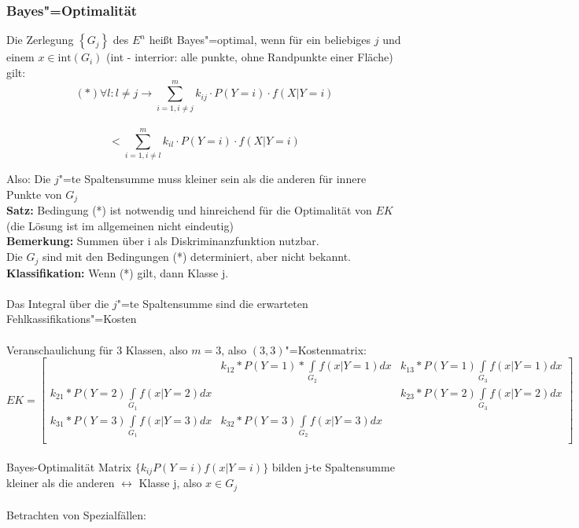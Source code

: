 \documentclass[a4paper,12pt]{scrreprt}
\newcommand{\Nb}[1]{\textbf{#1}}
\begin{document}
\subsubsection{Bayes"=Optimalität}
Die Zerlegung $\left\{ G_j \right\}$ des $E^n$ heißt Bayes"=optimal,
wenn für ein beliebiges $j$ und einem $x\in \text{int}(G_i)$
(int - interrior: alle punkte, ohne Randpunkte einer Fläche) gilt:\\

$$ (*) \forall l: l\not=j\to \sum\limits^m_{i=1, i\not=j}k_{ij}\cdot
P(Y=i)\cdot f(X|Y=i)$$\\
$$<\sum\limits^m_{i=1, i\not=l}k_{il}\cdot P(Y=i)\cdot f(X|Y=i)$$

Also: Die $j$"=te Spaltensumme muss kleiner sein als die anderen für
innere Punkte von $G_j$\\
\Nb{Satz:} Bedingung (*) ist notwendig und hinreichend für die Optimalität
von $EK$ (die Lösung ist im allgemeinen nicht eindeutig)\\
\Nb{Bemerkung:} Summen über i als Diskriminanzfunktion nutzbar.\\
Die $G_j$ sind mit den Bedingungen (*) determiniert, aber nicht bekannt.\\
\Nb{Klassifikation:} Wenn (*) gilt, dann Klasse j.\\
\\
Das Integral über die $j$"=te Spaltensumme sind die erwarteten
Fehlkassifikations"=Kosten\\
\\
Veranschaulichung für 3 Klassen, also $m=3$, also $(3,3)$"=Kostenmatrix:
$$EK=\begin{bmatrix}&k_{12}*P(Y=1)*\int\limits_{G_2}f(x|Y=1)dx&k_{13}*P(Y=1)\int\limits_{G_3}f(x|Y=1)dx\\
	k_{21}*P(Y=2)\int\limits_{G_1}f(x|Y=2)dx&&k_{23}*P(Y=2)\int\limits_{G_3}f(x|Y=2)dx\\
k_{31}*P(Y=3)\int\limits_{G_1}f(x|Y=3)dx&k_{32}*P(Y=3)\int\limits_{G_2}f(x|Y=3)dx&\\
\end{bmatrix}$$\\
Bayes-Optimalität Matrix $\{ k_{ij} P(Y=i) f(x|Y=i)\}$ bilden j-te Spaltensumme kleiner als die anderen $\leftrightarrow$ Klasse j, also $x \in G_j$\\
\\
Betrachten von Spezialfällen:
\end{document}

